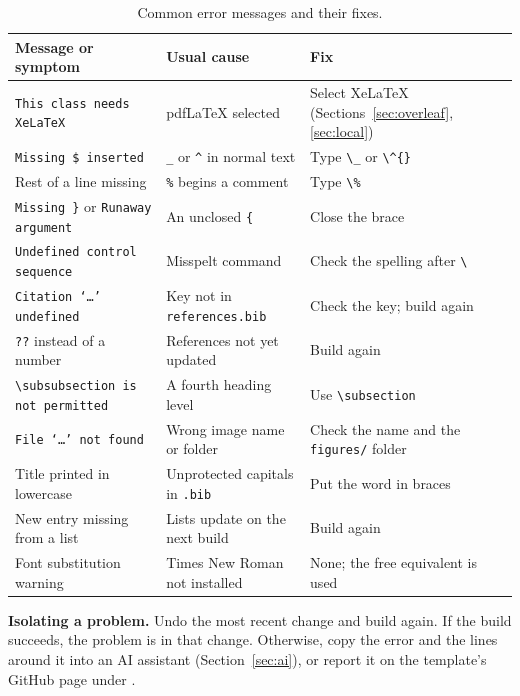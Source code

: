 \documentclass[11pt,a4paper]{article}
\newcommand\cmd[1]{\texttt{\textbackslash #1}}
\newcommand\file[1]{\texttt{#1}}
\newcommand\thd[1]{\bfseries #1}
\begin{document}
\begin{table}[htbp]
\caption{Common error messages and their fixes.}
\label{tab:trouble}
\small
\begin{tabularx}{\textwidth}{@{}>{\raggedright\arraybackslash}p{46mm}>{\raggedright\arraybackslash}X>{\raggedright\arraybackslash}X@{}}
\toprule
\thd{Message or symptom} & \thd{Usual cause} & \thd{Fix} \\
\midrule
\texttt{This class needs XeLaTeX} & pdfLaTeX selected & Select XeLaTeX (Sections~\ref{sec:overleaf}, \ref{sec:local}) \\
\texttt{Missing \$ inserted} & \texttt{\_} or \texttt{\^{}} in normal text & Type \texttt{\textbackslash\_} or \texttt{\textbackslash\^{}\{\}} \\
Rest of a line missing & \texttt{\%} begins a comment & Type \texttt{\textbackslash\%} \\
\texttt{Missing \}} or \texttt{Runaway argument} & An unclosed \texttt{\{} & Close the brace \\
\texttt{Undefined control sequence} & Misspelt command & Check the spelling after \texttt{\textbackslash} \\
\texttt{Citation `\ldots' undefined} & Key not in \file{references.bib} & Check the key; build again \\
\texttt{??} instead of a number & References not yet updated & Build again \\
\texttt{\textbackslash subsubsection is not permitted} & A fourth heading level & Use \cmd{subsection} \\
\texttt{File `\ldots' not found} & Wrong image name or folder & Check the name and the \file{figures/} folder \\
Title printed in lowercase & Unprotected capitals in \file{.bib} & Put the word in braces \\
New entry missing from a list & Lists update on the next build & Build again \\
Font substitution warning & Times New Roman not installed & None; the free equivalent is used \\
\bottomrule
\end{tabularx}
\end{table}

\textbf{Isolating a problem.} Undo the most recent change and build again. If
the build succeeds, the problem is in that change. Otherwise, copy the error
and the lines around it into an AI assistant (Section~\ref{sec:ai}), or report
it on the template's GitHub page under .
\end{document}
